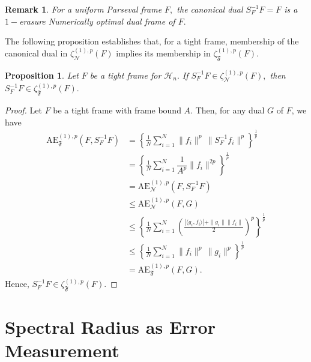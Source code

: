 \documentclass[final,1p,times]{elsarticle}
\newtheorem{rem}[thm]{Remark}
\newtheorem{prop}[thm]{Proposition}
\begin{document}
    

    \begin{rem}
         For  a uniform Parseval frame $F,$ the canonical dual $S_{F}^{-1}F =F$ is a $1-$erasure Numerically optimal dual frame of $F.$
    \end{rem}


The following proposition establishes that, for a tight frame, membership of the canonical dual in \( \zeta_{\mathcal{N}}^{(1),p}(F) \) implies its membership in \( \zeta_{\mathfrak{F}}^{(1),p}(F) \).

 \begin{prop}\label{prop6point2}
	Let $F$ be a tight frame for $\mathcal{H}_n.$ If $ S_{F}^{-1}F\in \zeta_{\mathcal{N}}^{(1),p}(F),$ then  $ S_{F}^{-1}F\in \zeta_{\mathfrak{F}}^{(1),p}(F).$ 
	
\end{prop}

\begin{proof}
    Let \( F \) be a tight frame with frame bound \( A \). Then, for any dual \( G \) of \( F \), we have
\begin{align*}
    \mathrm{AE}_{\mathfrak{F}}^{(1),p}(F, S_{F}^{-1}F) &=\left\{\frac{1}{N} \sum \limits_{i=1}^N\|f_i\|^p\,\|  S_{F}^{-1}f_i \| ^p\right\}^{\frac{1}{p}}\\&
    = \left\{\frac{1}{N} \sum\limits_{i=1}^N\dfrac{1}{A^p} \|f_i\|^{2p}\right\}^{\frac{1}{p}} \\&
    =  \mathrm{AE}_{\mathcal{N}}^{(1),p}(F, S_{F}^{-1}F) \\&
    \leq\mathrm{AE}_{\mathcal{N}}^{(1),p}(F, G) \\&
    \leq \left\{\frac{1}{N} \sum\limits_{i=1}^N\left( \frac{|\langle g_i,f_i\rangle| + \|g_i\|\|f_i\|}{2}\right)^p\right\}^{\frac{1}{p}}\\&
    \leq \left\{\frac{1}{N} \sum \limits_{i=1}^N\|f_i\|^p\,\|  g_i \| ^p\right\}^{\frac{1}{p}}\\&
    = \mathrm{AE}_{\mathfrak{F}}^{(1),p}(F, G) .
\end{align*}
 Hence, $ S_{F}^{-1}F\in \zeta_{\mathfrak{F}}^{(1),p}(F).$    
  
\end{proof}      


	
	
	
\section{Spectral Radius as Error Measurement}
\end{document}
